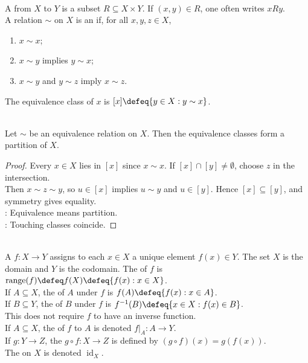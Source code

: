 \begin{definition} \label{def:relations-and-equivalence} \\
A  from $X$ to $Y$ is a subset $R\subseteq X\times Y$. If $(x,y)\in R$, one often writes $xRy$.\\
A relation $\sim$ on $X$ is an  if, for all $x,y,z\in X$,
\begin{enumerate}[label=\roman*.]
\setlength{\itemsep}{0pt}
\item $x\sim x$;
\item $x\sim y$ implies $y\sim x$;
\item $x\sim y$ and $y\sim z$ imply $x\sim z$.
\end{enumerate}
The equivalence class of $x$ is $[x]\defeq\{y\in X:y\sim x\}$.
\end{definition}

\begin{proposition} \label{prop:equivalence-relations-partitions} \\
Let $\sim$ be an equivalence relation on $X$. Then the equivalence classes form a partition of $X$.
\begin{proof}
Every $x\in X$ lies in $[x]$ since $x\sim x$. If $[x]\cap[y]\neq\emptyset$, choose $z$ in the intersection.\\
Then $x\sim z\sim y$, so $u\in[x]$ implies $u\sim y$ and $u\in[y]$. Hence $[x]\subseteq[y]$, and symmetry gives equality.\\
: Equivalence means partition.\\
: Touching classes coincide.
\end{proof}
\end{proposition}

\begin{definition} \label{def:functions-images-preimages} \\
A  $f:X\to Y$ assigns to each $x\in X$ a unique element $f(x)\in Y$. The set $X$ is the domain and $Y$ is the codomain. The  of $f$ is $\operatorname{range}(f)\defeq f(X)\defeq\{f(x):x\in X\}$.\\
If $A\subseteq X$, the  of $A$ under $f$ is $f(A)\defeq\{f(x):x\in A\}$.\\
If $B\subseteq Y$, the  of $B$ under $f$ is $f^{-1}(B)\defeq\{x\in X:f(x)\in B\}$.\\
This does not require $f$ to have an inverse function.\\
If $A\subseteq X$, the  of $f$ to $A$ is denoted $f|_A:A\to Y$.\\
If $g:Y\to Z$, the  $g\circ f:X\to Z$ is defined by $(g\circ f)(x)=g(f(x))$.\\
The  on $X$ is denoted $\operatorname{id}_X$.
\end{definition}

